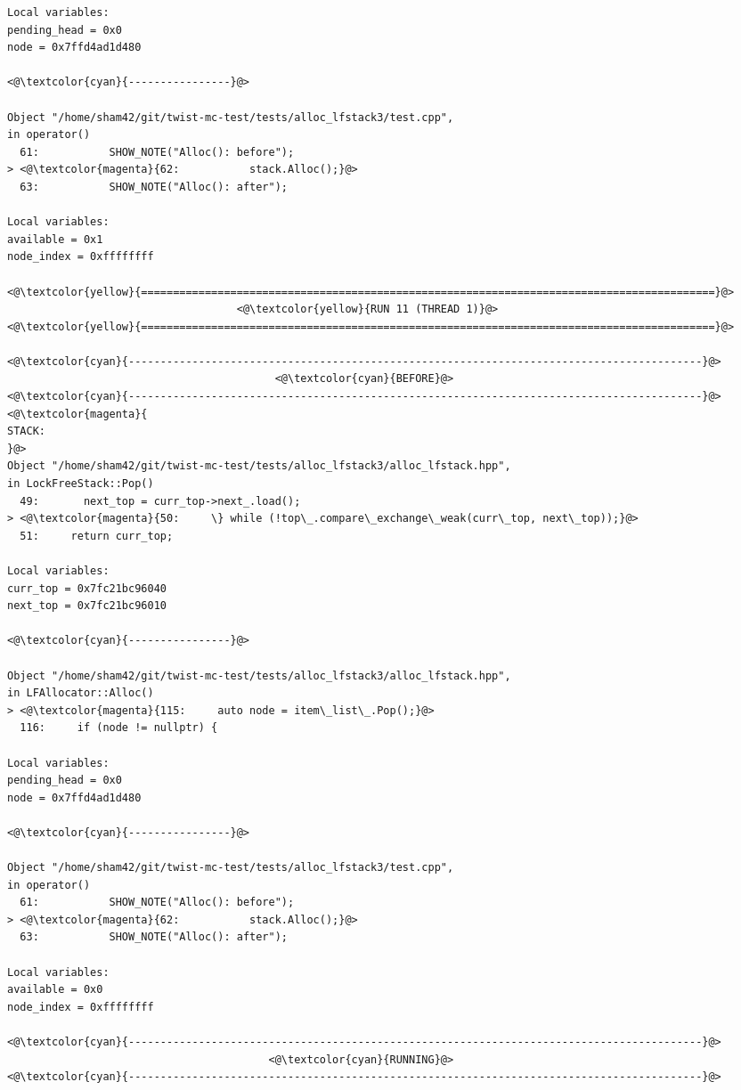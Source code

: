 \begin{adjustwidth}{-3.3cm}{-1cm}
\begin{allintypewriter}
\begin{multicols*}{2}
\begin{lstlisting}[numbers=none]
Local variables: 
pending_head = 0x0
node = 0x7ffd4ad1d480

<@\textcolor{cyan}{----------------}@>

Object "/home/sham42/git/twist-mc-test/tests/alloc_lfstack3/test.cpp",
in operator()
  61:           SHOW_NOTE("Alloc(): before");
> <@\textcolor{magenta}{62:           stack.Alloc();}@>
  63:           SHOW_NOTE("Alloc(): after");

Local variables: 
available = 0x1
node_index = 0xffffffff

<@\textcolor{yellow}{==========================================================================================}@>
                                    <@\textcolor{yellow}{RUN 11 (THREAD 1)}@>
<@\textcolor{yellow}{==========================================================================================}@>

<@\textcolor{cyan}{------------------------------------------------------------------------------------------}@>
                                          <@\textcolor{cyan}{BEFORE}@>
<@\textcolor{cyan}{------------------------------------------------------------------------------------------}@>
<@\textcolor{magenta}{
STACK:
}@>
Object "/home/sham42/git/twist-mc-test/tests/alloc_lfstack3/alloc_lfstack.hpp",
in LockFreeStack::Pop()
  49:       next_top = curr_top->next_.load();
> <@\textcolor{magenta}{50:     \} while (!top\_.compare\_exchange\_weak(curr\_top, next\_top));}@>
  51:     return curr_top;

Local variables: 
curr_top = 0x7fc21bc96040
next_top = 0x7fc21bc96010

<@\textcolor{cyan}{----------------}@>

Object "/home/sham42/git/twist-mc-test/tests/alloc_lfstack3/alloc_lfstack.hpp",
in LFAllocator::Alloc()
> <@\textcolor{magenta}{115:     auto node = item\_list\_.Pop();}@>
  116:     if (node != nullptr) {

Local variables: 
pending_head = 0x0
node = 0x7ffd4ad1d480

<@\textcolor{cyan}{----------------}@>

Object "/home/sham42/git/twist-mc-test/tests/alloc_lfstack3/test.cpp",
in operator()
  61:           SHOW_NOTE("Alloc(): before");
> <@\textcolor{magenta}{62:           stack.Alloc();}@>
  63:           SHOW_NOTE("Alloc(): after");

Local variables: 
available = 0x0
node_index = 0xffffffff

<@\textcolor{cyan}{------------------------------------------------------------------------------------------}@>
                                         <@\textcolor{cyan}{RUNNING}@>
<@\textcolor{cyan}{------------------------------------------------------------------------------------------}@>


\end{lstlisting}
\end{multicols*}
\end{allintypewriter}
\end{adjustwidth}
